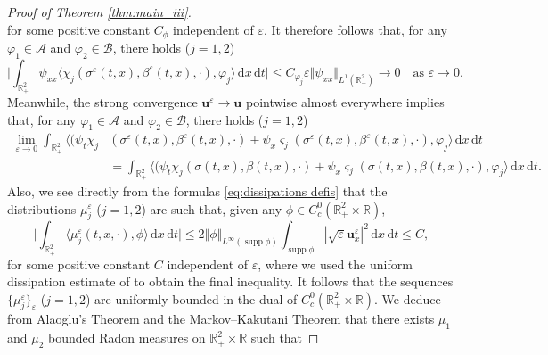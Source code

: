 \documentclass[11pt,a4paper,reqno]{amsart}
\numberwithin{equation}{section}
\theoremstyle{definition}
\theoremstyle{remark}
\newcommand{\bu}{\mathbf{u}}
\renewcommand{\d}{\, \mathrm{d}}
\renewcommand{\leq}{\leqslant}
\DeclareMathOperator\supp{supp}
\begin{document}
{\begin{proof}[Proof of Theorem \ref{thm:main_iii}]
\begin{equation*}
    \end{equation*}
    for some positive constant $C_\phi$ independent of $\varepsilon$. It therefore follows that, for any $\varphi_1 \in \mathcal{A}$ and $\varphi_2 \in \mathcal{B}$, there holds ($j=1,2$) 
    \begin{equation*}
        \bigg| \int_{\mathbb{R}^2_+} \psi_{xx} \langle \chi_j(\sigma^\varepsilon(t,x),\beta^\varepsilon(t,x),\cdot) , \varphi_j \rangle \d x \d t \bigg| \leq C_{\varphi_j} \varepsilon \Vert \psi_{xx} \Vert_{L^1(\mathbb{R}^2_+)} \to 0 \quad \text{as } \varepsilon \to 0. 
    \end{equation*}
    Meanwhile, the strong convergence $\bu^\varepsilon \to \bu$ pointwise almost everywhere implies that, for any $\varphi_1 \in \mathcal{A}$ and $\varphi_2 \in \mathcal{B}$, there holds ($j=1,2$) 
    \begin{equation*}
    \begin{aligned}
        \lim_{\varepsilon\to0}\int_{\mathbb{R}^2_+} \Big\langle \Big( \psi_t \chi_j&(\sigma^\varepsilon(t,x),\beta^\varepsilon(t,x),\cdot) + \psi_x \varsigma_j(\sigma^\varepsilon(t,x),\beta^\varepsilon(t,x),\cdot) , \varphi_j \Big\rangle \d x \d t \\ 
        &= \int_{\mathbb{R}^2_+} \Big\langle \Big( \psi_t \chi_j(\sigma(t,x),\beta(t,x),\cdot) + \psi_x \varsigma_j(\sigma(t,x),\beta(t,x),\cdot) , \varphi_j \Big\rangle \d x \d t. 
    \end{aligned}
    \end{equation*}
   Also, we see directly from the formulas \eqref{eq:dissipations defis} that the distributions $\mu^\varepsilon_j$ ($j=1,2$) are such that, given any $\phi \in C^0_c(\mathbb{R}^2_+\times\mathbb{R})$, 
\begin{equation}\label{eq:est for bounded radon}
    \bigg|\int_{\mathbb{R}^2_+} \langle \mu^\varepsilon_j(t,x,\cdot),\phi \rangle \d x \d t \bigg| \leq 2\Vert \phi \Vert_{L^\infty(\supp \phi)} \int_{\supp \phi} |\sqrt{\varepsilon}\bu^\varepsilon_x|^2 \d x \d t \leq C, 
\end{equation}
   for some positive constant $C$ independent of $\varepsilon$, where we used the uniform dissipation estimate of  to obtain the final inequality. It follows that the sequences $\{\mu^\varepsilon_j\}_\varepsilon$ ($j=1,2$) are uniformly bounded in the dual of $C^0_c(\mathbb{R}^2_+\times\mathbb{R})$. We deduce from Alaoglu's Theorem and the Markov--Kakutani Theorem that there exists $\mu_1$ and $\mu_2$ bounded Radon measures on $\mathbb{R}^2_+\times\mathbb{R}$ such that 

\end{proof}}
\end{document}
